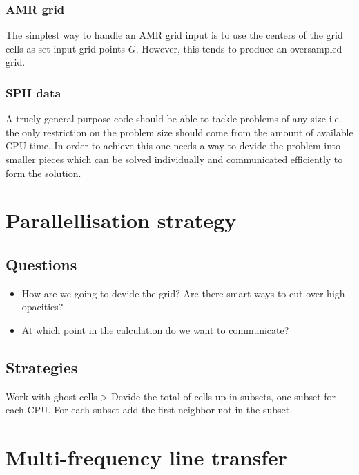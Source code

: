 \documentclass[]{article}
\begin{document}
\subsubsection{AMR grid}

The simplest way to handle an AMR grid input is to use the centers of the grid cells as set input grid points $G$. However, this tends to produce an oversampled grid.



\subsubsection{SPH data}

A truely general-purpose code should be able to tackle problems of any size i.e. the only restriction on the problem size should come from the amount of available CPU time.  In order to achieve this one needs a way to devide the problem into smaller pieces which can be solved individually and communicated efficiently to form the solution.


\section{Parallellisation strategy}


\subsection{Questions}

\begin{itemize}
\item How are we going to devide the grid? Are there smart ways to cut over high opacities?
\item At which point in the calculation do we want to communicate?
\end{itemize}

\subsection{Strategies}

Work with ghost cells-> Devide the total of cells up in subsets, one subset for each CPU. For each subset add the first neighbor not in the subset.


\section{Multi-frequency line transfer}
\end{document}
